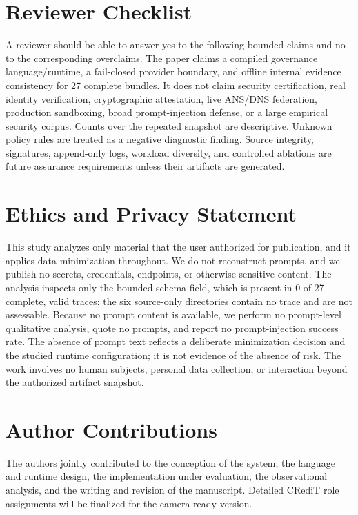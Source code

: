 \section*{Reviewer Checklist}\label{sec:reviewer-checklist}
A reviewer should be able to answer yes to the following bounded claims and no
to the corresponding overclaims.  The paper claims a compiled governance
language/runtime, a fail-closed provider boundary, and offline internal evidence
consistency for 27 complete bundles.  It does not claim security certification,
real identity verification, cryptographic attestation, live ANS/DNS federation,
production sandboxing, broad prompt-injection defense, or a large empirical
security corpus.  Counts over the repeated snapshot are descriptive.  Unknown
policy rules are treated as a negative diagnostic finding.  Source integrity,
signatures, append-only logs, workload diversity, and controlled ablations are
future assurance requirements unless their artifacts are generated.

\section*{Ethics and Privacy Statement}\label{sec:ethics}
This study analyzes only material that the user authorized for publication, and
it applies data minimization throughout. We do not reconstruct prompts, and we
publish no secrets, credentials, endpoints, or otherwise sensitive content. The
analysis inspects only the bounded  schema field,
which is present in 0 of 27 complete, valid traces; the six source-only
directories contain no trace and are not assessable. Because no prompt content is
available, we perform no prompt-level qualitative analysis, quote no prompts, and
report no prompt-injection success rate. The absence of prompt text reflects a
deliberate minimization decision and the studied runtime configuration; it is
not evidence of the absence of risk. The work involves no human subjects,
personal data collection, or interaction beyond the authorized artifact
snapshot.

\section*{Author Contributions}\label{sec:contributions}
The authors jointly contributed to the conception of the system, the language
and runtime design, the implementation under evaluation, the observational
analysis, and the writing and revision of the manuscript. Detailed CRediT role
assignments will be finalized for the camera-ready version.

